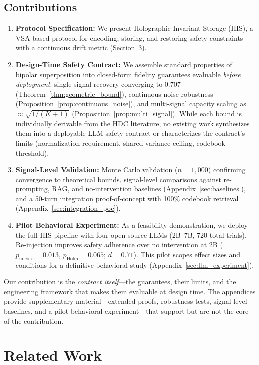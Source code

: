 \documentclass[a4paper,11pt]{article}
\begin{document}
\subsection{Contributions}
\begin{enumerate}
    \item \textbf{Protocol Specification:} We present Holographic Invariant Storage (HIS), a VSA-based protocol for encoding, storing, and restoring safety constraints with a continuous drift metric (Section~3).
    \item \textbf{Design-Time Safety Contract:} We assemble standard properties of bipolar superposition \cite{kanerva2009} into closed-form fidelity guarantees evaluable \textit{before deployment}: single-signal recovery converging to $0.707$ (Theorem~\ref{thm:geometric_bound}), continuous-noise robustness (Proposition~\ref{prop:continuous_noise}), and multi-signal capacity scaling as $\approx\!\sqrt{1/(K{+}1)}$ (Proposition~\ref{prop:multi_signal}). While each bound is individually derivable from the HDC literature, no existing work synthesizes them into a deployable LLM safety contract or characterizes the contract's limits (normalization requirement, shared-variance ceiling, codebook threshold).
    \item \textbf{Signal-Level Validation:} Monte Carlo validation ($n = 1{,}000$) confirming convergence to theoretical bounds, signal-level comparisons against re-prompting, RAG, and no-intervention baselines (Appendix~\ref{sec:baselines}), and a 50-turn integration proof-of-concept with 100\% codebook retrieval (Appendix~\ref{sec:integration_poc}).
    \item \textbf{Pilot Behavioral Experiment:} As a feasibility demonstration, we deploy the full HIS pipeline with four open-source LLMs (2B--7B, 720 total trials). Re-injection improves safety adherence over no intervention at 2B ($p_{\text{uncorr}} = 0.013$, $p_{\text{Holm}} = 0.065$; $d = 0.71$). This pilot scopes effect sizes and conditions for a definitive behavioral study (Appendix~\ref{sec:llm_experiment}).
\end{enumerate}

Our contribution is the \textit{contract itself}---the guarantees, their limits, and the engineering framework that makes them evaluable at design time. The appendices provide supplementary material---extended proofs, robustness tests, signal-level baselines, and a pilot behavioral experiment---that support but are not the core of the contribution.

\section{Related Work}
\label{sec:related_work}
\end{document}
